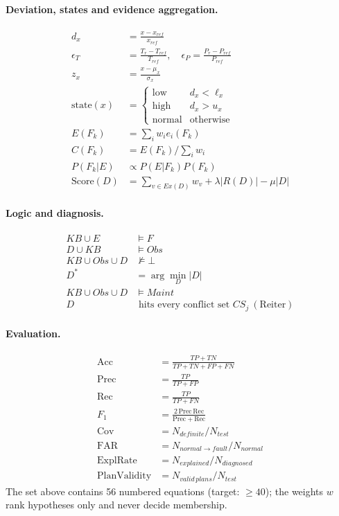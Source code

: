 \documentclass[11pt,a4paper]{article}
\begin{document}
\paragraph{Deviation, states and evidence aggregation.}
\begin{align}
d_x&=\frac{x-x_{ref}}{x_{ref}}\\ \epsilon_T&=\frac{T_r-T_{ref}}{T_{ref}},\quad \epsilon_P=\frac{P_r-P_{ref}}{P_{ref}}\\ z_x&=\frac{x-\mu_x}{\sigma_x}\\ \mathrm{state}(x)&=\begin{cases}\text{low}&d_x<\ell_x\\\text{high}&d_x>u_x\\\text{normal}&\text{otherwise}\end{cases}\\ E(F_k)&=\sum_iw_ie_i(F_k)\\ C(F_k)&=E(F_k)/\textstyle\sum_iw_i\\ P(F_k|E)&\propto P(E|F_k)P(F_k)\\ \mathrm{Score}(D)&=\sum_{v\in Ex(D)}w_v+\lambda|R(D)|-\mu|D|
\end{align}
\paragraph{Logic and diagnosis.}
\begin{align}
KB\cup E&\models F\\ D\cup KB&\models Obs\\ KB\cup Obs\cup D&\not\models\bot\\ D^*&=\arg\min_{D}|D|\\ KB\cup Obs\cup D&\models Maint\\ D&\text{ hits every conflict set }CS_j\ (\text{Reiter})
\end{align}
\paragraph{Evaluation.}
\begin{align}
\mathrm{Acc}&=\tfrac{TP+TN}{TP+TN+FP+FN}\\ \mathrm{Prec}&=\tfrac{TP}{TP+FP}\\ \mathrm{Rec}&=\tfrac{TP}{TP+FN}\\ F_1&=\tfrac{2\,\mathrm{Prec}\,\mathrm{Rec}}{\mathrm{Prec}+\mathrm{Rec}}\\ \mathrm{Cov}&=N_{definite}/N_{test}\\ \mathrm{FAR}&=N_{normal\to fault}/N_{normal}\\ \mathrm{ExplRate}&=N_{explained}/N_{diagnosed}\\ \mathrm{PlanValidity}&=N_{valid\,plans}/N_{test}
\end{align}
The set above contains 56 numbered equations (target: $\ge40$); the weights $w$ rank hypotheses only and never decide membership.
\end{document}
